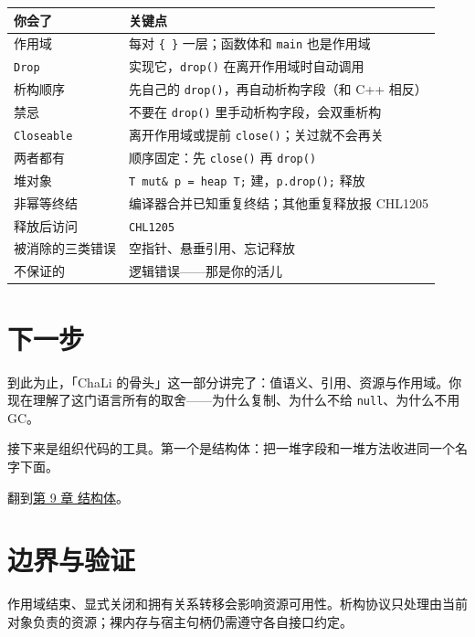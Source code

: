 \begin{center}
\begin{tabular}{ll}
\toprule
你会了 & 关键点 \\
\midrule
作用域 & 每对 \texttt{\{ \}} 一层；函数体和 \texttt{main} 也是作用域 \\
\texttt{Drop} & 实现它，\texttt{drop(\allowbreak{})\allowbreak{}} 在离开作用域时自动调用 \\
析构顺序 & 先自己的 \texttt{drop(\allowbreak{})\allowbreak{}}，再自动析构字段（和 C++ 相反） \\
禁忌 & 不要在 \texttt{drop(\allowbreak{})\allowbreak{}} 里手动析构字段，会双重析构 \\
\texttt{Closeable} & 离开作用域或提前 \texttt{close(\allowbreak{})\allowbreak{}}；关过就不会再关 \\
两者都有 & 顺序固定：先 \texttt{close(\allowbreak{})\allowbreak{}} 再 \texttt{drop(\allowbreak{})\allowbreak{}} \\
堆对象 & \texttt{T mut\& p =\allowbreak{} heap T;} 建，\texttt{p.\allowbreak{}drop(\allowbreak{})\allowbreak{};} 释放 \\
非幂等终结 & 编译器合并已知重复终结；其他重复释放报 CHL1205 \\
释放后访问 & \texttt{CHL1205} \\
被消除的三类错误 & 空指针、悬垂引用、忘记释放 \\
不保证的 & 逻辑错误——那是你的活儿 \\
\bottomrule
\end{tabular}
\end{center}

\section{下一步}

到此为止，「ChaLi 的骨头」这一部分讲完了：值语义、引用、资源与作用域。你现在理解了这门语言所有的取舍——为什么复制、为什么不给 \texttt{null}、为什么不用 GC。

接下来是组织代码的工具。第一个是结构体：把一堆字段和一堆方法收进同一个名字下面。

翻到\hyperref[ch:09]{第 9 章 结构体}。

\section{边界与验证}

作用域结束、显式关闭和拥有关系转移会影响资源可用性。析构协议只处理由当前对象负责的资源；裸内存与宿主句柄仍需遵守各自接口约定。

